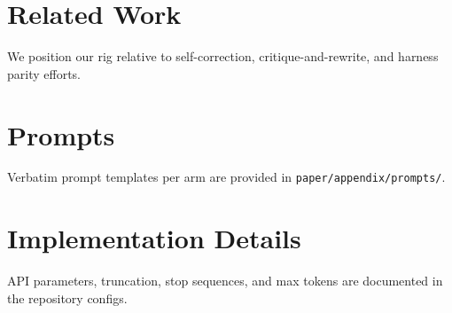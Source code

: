 \documentclass[11pt]{article}
\begin{document}
\section{Related Work}
We position our rig relative to self-correction, critique-and-rewrite, and harness parity efforts.




\appendix
\section{Prompts}
Verbatim prompt templates per arm are provided in \texttt{paper/appendix/prompts/}.

\section{Implementation Details}
API parameters, truncation, stop sequences, and max tokens are documented in the repository configs.
\end{document}
